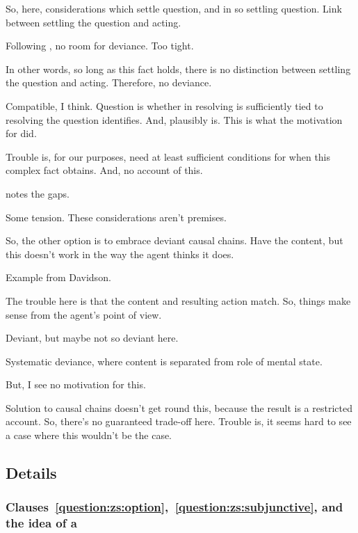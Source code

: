 \begin{note}
  So, here, considerations which settle question, and in so settling question.
  Link between settling the question and acting.

  Following \citeauthor{Hieronymi:2011aa}, no room for deviance.
  Too tight.

  In other words, so long as this fact holds, there is no distinction between settling the question and acting.
  Therefore, no deviance.

  Compatible, I think.
  Question is whether in resolving \qzS{} is sufficiently tied to resolving the question \citeauthor{Hieronymi:2011aa} identifies.
  And, plausibly is.
  This is what the motivation for \qzS{} did.

  Trouble is, for our purposes, need at least sufficient conditions for when this complex fact obtains.
  And, no account of this.

  \citeauthor{Hieronymi:2011aa} notes the gaps.

  Some tension.
  These considerations aren't premises.
\end{note}

\begin{note}
  So, the other option is to embrace deviant causal chains.
  Have the content, but this doesn't work in the way the agent thinks it does.

  Example from Davidson.

  The trouble here is that the content and resulting action match.
  So, things make sense from the agent's point of view.

  Deviant, but maybe not so deviant here.

  Systematic deviance, where content is separated from role of mental state.

  But, I see no motivation for this.

  Solution to causal chains doesn't get round this, because the result is a restricted account.
  So, there's no guaranteed trade-off here.
  Trouble is, it seems hard to see a case where this wouldn't be the case.
\end{note}


\subsection{Details}
\label{cha:zS:sec:details}

\subsubsection{Clauses~\ref{question:zs:option},~\ref{question:zs:subjunctive}, and the idea of a }
\label{cha:zS:sec:clauses-idea-requ1}

